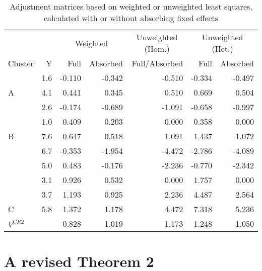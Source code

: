 \documentclass[12pt]{article}
\begin{document}
\begin{table}

\caption{\label{tab:example}Adjustment matrices based on weighted or unweighted least squares, calculated with or without absorbing fixed effects}
\centering
\begin{tabular}[t]{lrrrrrr}
\toprule
\multicolumn{2}{c}{ } & \multicolumn{2}{c}{Weighted} & \multicolumn{1}{c}{Unweighted (Hom.)} & \multicolumn{2}{c}{Unweighted (Het.)} \\
\cmidrule(l{3pt}r{3pt}){3-4} \cmidrule(l{3pt}r{3pt}){5-5} \cmidrule(l{3pt}r{3pt}){6-7}
Cluster & Y & Full & Absorbed & Full/Absorbed & Full & Absorbed\\
\midrule
 & 1.6 & -0.110 & -0.342 & -0.510 & -0.334 & -0.497\\

\multirow[t]{-2}{*}{\raggedright\arraybackslash A} & 4.1 & 0.441 & 0.345 & 0.510 & 0.669 & 0.504\\

 & 2.6 & -0.174 & -0.689 & -1.091 & -0.658 & -0.997\\

 & 1.0 & 0.409 & 0.203 & 0.000 & 0.358 & 0.000\\

\multirow[t]{-3}{*}{\raggedright\arraybackslash B} & 7.6 & 0.647 & 0.518 & 1.091 & 1.437 & 1.072\\

 & 6.7 & -0.353 & -1.954 & -4.472 & -2.786 & -4.089\\

 & 5.0 & 0.483 & -0.176 & -2.236 & -0.770 & -2.342\\

 & 3.1 & 0.926 & 0.532 & 0.000 & 1.757 & 0.000\\

 & 3.7 & 1.193 & 0.925 & 2.236 & 4.487 & 2.564\\

\multirow[t]{-5}{*}{\raggedright\arraybackslash C} & 5.8 & 1.372 & 1.178 & 4.472 & 7.318 & 5.236\\
\midrule

$V^{CR2}$ &  & 0.828 & 1.019 & 1.173 & 1.248 & 1.050\\
\bottomrule
\end{tabular}
\end{table}

\hypertarget{a-revised-theorem-2}{%
\section{A revised Theorem 2}\label{a-revised-theorem-2}}
\end{document}
